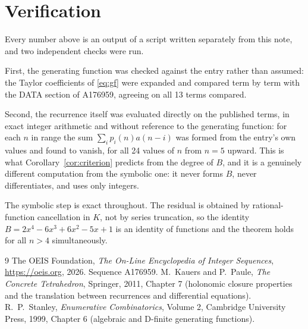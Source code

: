 \documentclass[11pt,a4paper]{article}
\theoremstyle{plain}
\theoremstyle{definition}
\begin{document}
\section{Verification}

Every number above is an output of a script written separately from this note, and two
independent checks were run.

First, the generating function was checked against the entry rather than assumed: the
Taylor coefficients of \eqref{eq:gf} were expanded and compared term by term with the DATA
section of A176959, agreeing on all 13 terms compared.

Second, the recurrence itself was evaluated directly on the published terms, in exact
integer arithmetic and without reference to the generating function: for each $n$ in range
the sum $\sum_{i}p_{i}(n)a(n-i)$ was formed from the entry's own values and found to
vanish, for all 24 values of $n$ from $n=5$ upward. This is what
Corollary~\ref{cor:criterion} predicts from the degree of $B$, and it is a genuinely
different computation from the symbolic one: it never forms $B$, never differentiates, and
uses only integers.

The symbolic step is exact throughout. The residual is obtained by rational-function
cancellation in $K$, not by series truncation, so the identity $B=2 x^{4} - 6 x^{3} + 6 x^{2} - 5 x + 1$ is an
identity of functions and the theorem holds for all $n>4$ simultaneously.

\begin{thebibliography}{9}
 The OEIS Foundation, \emph{The On-Line Encyclopedia of Integer Sequences},
\url{https://oeis.org}, 2026. Sequence A176959.
 M.~Kauers and P.~Paule, \emph{The Concrete Tetrahedron}, Springer, 2011,
Chapter 7 (holonomic closure properties and the translation between recurrences and
differential equations).
 R.~P.~Stanley, \emph{Enumerative Combinatorics}, Volume 2, Cambridge
University Press, 1999, Chapter 6 (algebraic and D-finite generating functions).
\end{thebibliography}
\end{document}
